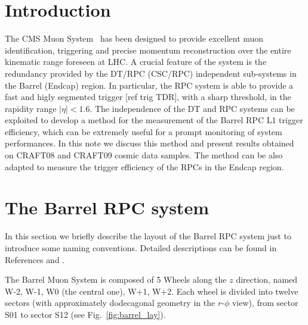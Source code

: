 \maketitle %

\section{Introduction}
The CMS Muon System~\cite{ref:mutdr}\cite{ref:jinst} has 
been designed to provide excellent muon
identification, triggering and precise momentum reconstruction 
over the entire kinematic range foreseen at LHC. A crucial
feature of the system is the redundancy provided by the DT/RPC 
(CSC/RPC) independent sub-systems in the Barrel (Endcap) region.
In particular, the RPC system is able to provide 
a fast and higly segmented trigger [ref trig TDR], with a 
sharp \pt threshold, in the rapidity range $|\eta| < 1.6$.
The independence of the DT and RPC systems can be exploited
to develop a method for the measurement of the Barrel RPC L1 
trigger efficiency, which can be extremely useful 
for a prompt monitoring of system performances.
In this note we discuss this method and present results
obtained on CRAFT08 and CRAFT09 cosmic data samples.
The method can be also adapted to measure the 
trigger efficiency of the RPCs in the Endcap region.

\section{The Barrel RPC system}
In this section we briefly describe the layout of the
Barrel RPC system just to introduce some
naming conventions. Detailed descriptions
can be found in References \cite{ref:mutdr}
and \cite{ref:jinst}.

The Barrel Muon System is composed of 5 Wheels along 
the $z$ direction, named W-2, W-1, W0 (the central one), 
W+1, W+2. Each wheel is divided into twelve 
sectors (with approximately dodecagonal geometry in the 
$r$-$\phi$ view), from sector S01 to sector S12 
(see Fig.~\ref{fig:barrel_lay}).

